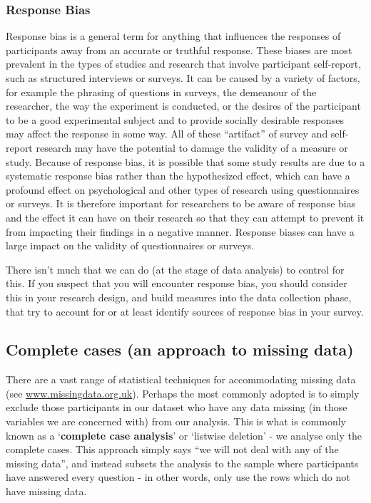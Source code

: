 \documentclass[
]{book}
\begin{document}
\hypertarget{response-bias}{%
\subsubsection{Response Bias}\label{response-bias}}

Response bias is a general term for anything that influences the responses of participants away from an accurate or truthful response. These biases are most prevalent in the types of studies and research that involve participant self-report, such as structured interviews or surveys. It can be caused by a variety of factors, for example the phrasing of questions in surveys, the demeanour of the researcher, the way the experiment is conducted, or the desires of the participant to be a good experimental subject and to provide socially desirable responses may affect the response in some way. All of these ``artifact'' of survey and self-report research may have the potential to damage the validity of a measure or study. Because of response bias, it is possible that some study results are due to a systematic response bias rather than the hypothesized effect, which can have a profound effect on psychological and other types of research using questionnaires or surveys. It is therefore important for researchers to be aware of response bias and the effect it can have on their research so that they can attempt to prevent it from impacting their findings in a negative manner. Response biases can have a large impact on the validity of questionnaires or surveys.

There isn't much that we can do (at the stage of data analysis) to control for this. If you suspect that you will encounter response bias, you should consider this in your research design, and build measures into the data collection phase, that try to account for or at least identify sources of response bias in your survey.

\hypertarget{complete-cases-an-approach-to-missing-data}{%
\subsection{Complete cases (an approach to missing data)}\label{complete-cases-an-approach-to-missing-data}}

There are a vast range of statistical techniques for accommodating missing data (see \url{www.missingdata.org.uk}). Perhaps the most commonly adopted is to simply exclude those participants in our dataset who have any data missing (in those variables we are concerned with) from our analysis. This is what is commonly known as a `\textbf{complete case analysis}' or `listwise deletion' - we analyse only the complete cases. This approach simply says ``we will not deal with any of the missing data'', and instead subsets the analysis to the sample where participants have answered every question - in other words, only use the rows which do not have missing data.
\end{document}
